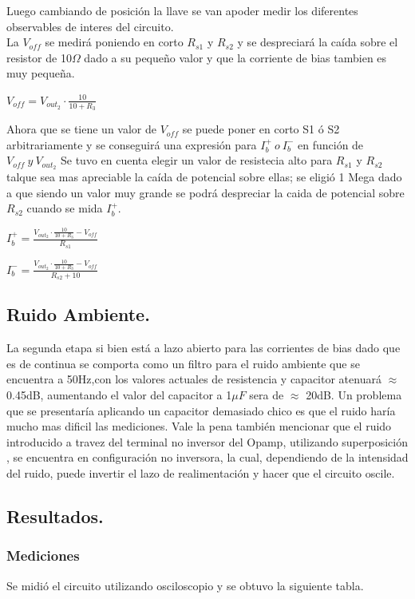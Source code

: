 Luego cambiando de posición la llave se van apoder medir los diferentes observables de interes del circuito.\\
La $V_{off}$ se medirá poniendo en corto $R_{s1}$ y $R_{s2}$ y se despreciará la caída sobre el resistor de 10$\Omega$ dado a su pequeño valor y que la corriente de bias tambien es muy pequeña.\\
\begin{center}$V_{off}=V_{out_2} \cdot \frac{10}{10+R_3} $\end{center}
Ahora que se tiene un valor de $V_{off}$ se  puede poner en corto S1 ó S2 arbitrariamente y se conseguirá una expresión para $ I_b^+ \ o \  I_b^-$ en función de $V_{off} \ y \ V_{out_2}$
Se tuvo en cuenta elegir un valor de resistecia alto para $R_{s1}$ y $R_{s2}$ talque sea mas apreciable la caída de potencial sobre ellas; se eligió 1 Mega dado a que siendo un valor muy grande se podrá despreciar la caida de potencial sobre $R_{s2}$  cuando se mida $I_b^+$.\\
\begin{center}$I_b^+=\frac{V_{out_2} \cdot \frac{10}{10+R_3}-V_{off}}{R_{s1}}$\end{center}
\begin{center}$I_b^-=\frac{V_{out_2} \cdot \frac{10}{10+R_3}-V_{off}}{R_{s2}+10}$\end{center}

\subsection{Ruido Ambiente.}
La segunda etapa si bien está a lazo abierto para las corrientes de bias dado que es de continua se comporta como un filtro para el ruido ambiente que se encuentra a 50Hz,con los valores actuales de resistencia y capacitor atenuará $\approx$ 0.45dB, aumentando el valor del capacitor a 1$\mu F$ sera de  $\approx$ 20dB.
Un problema que se presentaría aplicando un capacitor demasiado chico es que el ruido haría mucho mas dificil las mediciones.
Vale la pena también mencionar que el ruido introducido a travez del terminal no inversor del Opamp, utilizando superposición , se encuentra en configuración no inversora, la cual, dependiendo de la intensidad del ruido, puede invertir el lazo de realimentación y hacer que el circuito oscile.
\subsection{Resultados.}
\subsubsection{Mediciones}
Se midió el circuito utilizando osciloscopio y se  obtuvo la siguiente tabla.

